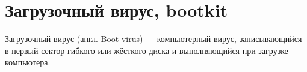 \section{Загрузочный вирус, bootkit}
Загрузочный вирус (англ. Boot virus) — компьютерный вирус, записывающийся в первый сектор гибкого или жёсткого диска и выполняющийся при загрузке компьютера. \cite{wiki}



